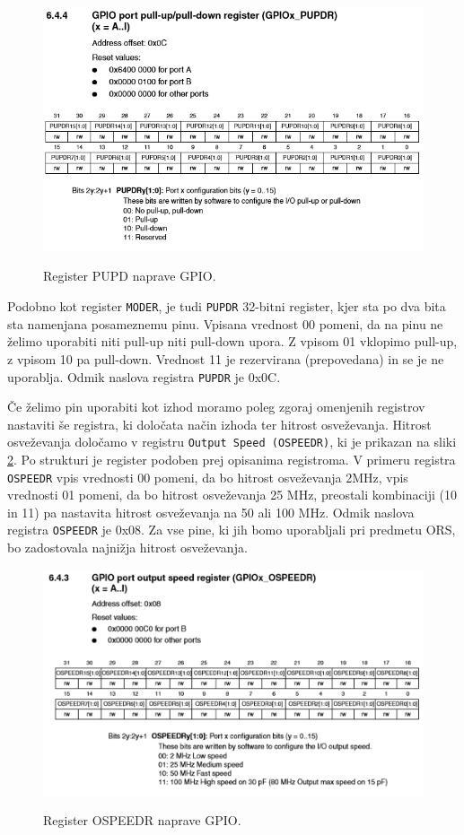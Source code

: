 \documentclass[12pt,letterpaper]{article}
\begin{document}
\begin{figure}[ht!]
  \centering
  \caption{Register PUPD naprave GPIO.}
  \includegraphics[width=350pt]{images/vaja3/pupdr.png}
  \label{pupdr}
\end{figure}

Podobno kot register \texttt{MODER}, je tudi \texttt{PUPDR} 32-bitni register, kjer sta po dva bita sta namenjana posameznemu pinu. Vpisana vrednost 00 pomeni, da na pinu ne želimo uporabiti niti pull-up niti pull-down upora. Z vpisom 01 vklopimo pull-up, z vpisom 10 pa pull-down. Vrednost 11 je rezervirana (prepovedana) in se je ne uporablja. Odmik naslova registra \texttt{PUPDR} je 0x0C.

Če želimo pin uporabiti kot izhod moramo poleg zgoraj omenjenih registrov nastaviti še registra, ki določata način izhoda ter hitrost osveževanja. Hitrost osveževanja določamo v registru \texttt{Output Speed (OSPEEDR)}, ki je prikazan na sliki \ref{ospeedr}. Po strukturi je register podoben prej opisanima registroma. V primeru registra \texttt{OSPEEDR} vpis vrednosti 00 pomeni, da bo hitrost osveževanja 2MHz, vpis vrednosti 01 pomeni, da bo hitrost osveževanja 25 MHz, preostali kombinaciji (10 in 11) pa nastavita hitrost osveževanja na 50 ali 100 MHz. Odmik naslova registra \texttt{OSPEEDR} je 0x08. Za vse pine, ki jih bomo uporabljali pri predmetu ORS, bo zadostovala najnižja hitrost osveževanja.

\begin{figure}[ht!]
  \centering
  \caption{Register OSPEEDR naprave GPIO.}
  \includegraphics[width=350pt]{images/vaja3/odpspeedr.png}
  \label{ospeedr}
\end{figure}
\end{document}
